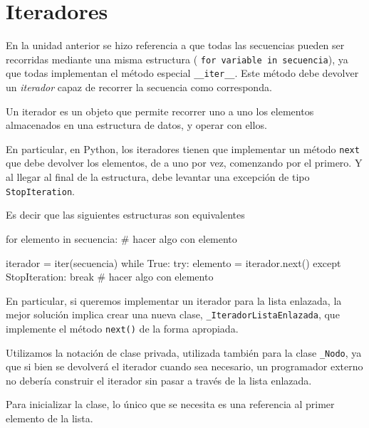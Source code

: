 \section{Iteradores}

En la unidad anterior se hizo referencia a que todas las secuencias
pueden ser recorridas mediante una misma estructura (
\lstinline!for variable in secuencia!), ya que todas implementan el método
especial \lstinline!__iter__!.  Este método debe devolver un {\it iterador}
capaz de recorrer la secuencia como corresponda.

\begin{observacion}
Un iterador es un objeto que permite recorrer uno a uno los elementos
almacenados en una estructura de datos, y operar con ellos.
\end{observacion}

En particular, en Python, los iteradores tienen que implementar un método
\lstinline!next! que debe devolver los elementos, de a uno por vez,
comenzando por el primero.  Y al llegar al final de la estructura, debe
levantar una excepción de tipo \lstinline!StopIteration!.

Es decir que las siguientes estructuras son equivalentes
\begin{codigo-python-sn}
for elemento in secuencia:
	# hacer algo con elemento
\end{codigo-python-sn}

\begin{codigo-python-sn}
iterador = iter(secuencia)
while True:
    try:
        elemento = iterador.next()
    except StopIteration:
        break
    # hacer algo con elemento
\end{codigo-python-sn}

En particular, si queremos implementar un iterador para la lista enlazada,
la mejor solución implica crear una nueva clase,
\lstinline!_IteradorListaEnlazada!, que implemente el método
\lstinline!next()! de la forma apropiada.

\begin{atencion}
Utilizamos la notación de clase privada, utilizada también para la clase
\lstinline!_Nodo!, ya que si bien se devolverá el iterador cuando sea
necesario, un programador externo no debería construir el iterador sin
pasar a través de la lista enlazada.
\end{atencion}

Para inicializar la clase, lo único que se necesita es una referencia al
primer elemento de la lista.

